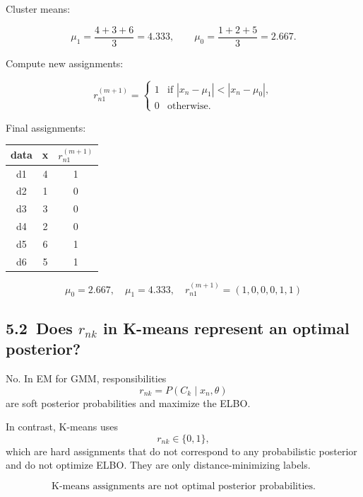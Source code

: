 \documentclass{article}
\begin{document}
Cluster means:

\[
\mu_1 = \frac{4+3+6}{3} = 4.333, \qquad
\mu_0 = \frac{1+2+5}{3} = 2.667.
\]

Compute new assignments:

\[
r_{n1}^{(m+1)} =
\begin{cases}
1 & \text{if } |x_n - \mu_1| < |x_n - \mu_0|,\\
0 & \text{otherwise}.
\end{cases}
\]

Final assignments:

\begin{center}
\begin{tabular}{|c|c|c|}
\hline
data & x & \(r_{n1}^{(m+1)}\)\\
\hline
d1 & 4 & 1\\
d2 & 1 & 0\\
d3 & 3 & 0\\
d4 & 2 & 0\\
d5 & 6 & 1\\
d6 & 5 & 1\\
\hline
\end{tabular}
\end{center}

\[
\boxed{
\mu_0 = 2.667,\quad \mu_1 = 4.333,\quad
r_{n1}^{(m+1)} = (1,0,0,0,1,1)
}
\]

\subsection*{5.2\ Does \(r_{nk}\) in K-means represent an optimal posterior?}

No. In EM for GMM, responsibilities
\[
r_{nk} = P(C_k \mid x_n, \theta)
\]
are soft posterior probabilities and maximize the ELBO.

In contrast, K-means uses
\[
r_{nk} \in \{0,1\},
\]
which are hard assignments that do not correspond to any probabilistic posterior and do not optimize ELBO. They are only distance-minimizing labels.

\[
\boxed{
\text{K-means assignments are not optimal posterior probabilities.}
}
\]
\end{document}
